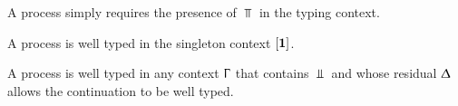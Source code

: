 \begin{AgdaAlign}
A  process simply requires the presence of $\Top$
in the typing context.

\begin{code}%
%
\>[3]%
\>[13]\AgdaSymbol{:}\AgdaSpace{}%
\AgdaSpace{}%
\AgdaOperator{\AgdaFunction{[}}\AgdaSpace{}%
\AgdaSpace{}%
\AgdaOperator{\AgdaFunction{]}}\<%
\end{code}

A  process is well typed in the singleton
context $[\mathbf{1}]$.

\begin{code}%
%
\>[3]%
\>[13]\AgdaSymbol{:}\AgdaSpace{}%
\AgdaSpace{}%
\AgdaSymbol{\}}\AgdaSpace{}%
\AgdaSymbol{(}\AgdaSpace{}%
\AgdaSymbol{:}\AgdaSpace{}%
\AgdaSpace{}%
\AgdaSpace{}%
\AgdaSpace{}%
\AgdaOperator{\AgdaFunction{,}}\AgdaSpace{}%
\AgdaSymbol{)}\AgdaSpace{}%
\AgdaSpace{}%
\AgdaSpace{}%
\AgdaSpace{}%
\AgdaSpace{}%
\AgdaSpace{}%
\<%
\end{code}

A  process is well typed in any context
$\Upgamma$ that contains $\Bot$ and whose residual $\Updelta$ allows the
continuation to be well typed.

\begin{code}%
%
\>[3]%
\>[13]\AgdaSymbol{:}%
\>[1531I]\AgdaSpace{}%
\AgdaSpace{}%
\AgdaSpace{}%
\AgdaSymbol{\}}\AgdaSpace{}%
\AgdaSymbol{(}\AgdaSpace{}%
\AgdaSymbol{:}\AgdaSpace{}%
\AgdaSymbol{)}\AgdaSpace{}%
\AgdaSymbol{(}\AgdaSpace{}%
\AgdaSymbol{:}\AgdaSpace{}%
\AgdaSpace{}%
\AgdaSpace{}%
\AgdaSpace{}%
\AgdaSpace{}%
\AgdaSpace{}%
\AgdaOperator{\AgdaFunction{,}}\AgdaSpace{}%
\AgdaSymbol{)}\AgdaSpace{}%
\<%
\\
\>[.][@{}l@{}]\<[1531I]%
\>[15]\AgdaSpace{}%
\AgdaSymbol{((}\AgdaSpace{}%
\AgdaSpace{}%
\AgdaSpace{}%
\AgdaSpace{}%
\AgdaSpace{}%
\AgdaSymbol{)}\AgdaSpace{}%
\AgdaSpace{}%
\AgdaSymbol{)}\AgdaSpace{}%
\AgdaSpace{}%
\AgdaSpace{}%
\<%
\end{code}


\end{AgdaAlign}
